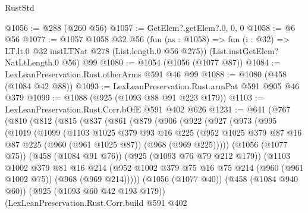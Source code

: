 \begin{lexlean}{RustStd}
\begin{coremodule}
@1056 := @288 (@260 @56)
@1057 := GetElem?.getElem?.{0, 0, 0}
@1058 := @6 @56
@1077 := @1057
    @1058
    @32
    @56
    (fun (as : @1058) => fun (i : @32) => LT.lt.{0} @32 instLTNat @278 (List.length.{0} @56 @275))
    (List.instGetElem?NatLtLength.{0} @56)
    @99
@1080 := @1054 (@1056 (@1077 @87))
@1084 := LexLeanPreservation.Rust.otherArms @591 @46 @99
@1088 := @1080 (@458 (@1084 @42 @88))
@1093 := LexLeanPreservation.Rust.armPat @591 @905 @46 @379
@1099 := @1088 (@925 (@1093 @88 @91 @223 @179))
@1103 := LexLeanPreservation.Rust.Corr.bOfE @591 @402 @626
@1231 := @641
    (@767
      (@810
        (@812
          (@815
            (@837
              (@861
                (@879
                  (@906
                    (@922
                      (@927
                        (@973
                          (@995
                            (@1019
                              (@1099
                                (@1103
                                  @1025
                                  @379
                                  @93
                                  @16
                                  @225
                                  (@952
                                    @1025
                                    @379
                                    @87
                                    @16
                                    @87
                                    @225
                                    (@960 (@961 @1025 @87))
                                    (@968 (@969 @225)))))
                              (@1056 (@1077 @75))
                              (@458 (@1084 @91 @76))
                              (@925 (@1093 @76 @79 @212 @179))
                              (@1103
                                @1002
                                @379
                                @81
                                @16
                                @214
                                (@952
                                  @1002
                                  @379
                                  @75
                                  @16
                                  @75
                                  @214
                                  (@960 (@961 @1002 @75))
                                  (@968 (@969 @214)))))
                            (@1056 (@1077 @40))
                            (@458 (@1084 @940 @60))
                            (@925 (@1093 @60 @42 @193 @179))
                            (LexLeanPreservation.Rust.Corr.build
                              @591
                              @402

\end{coremodule}
\end{lexlean}

